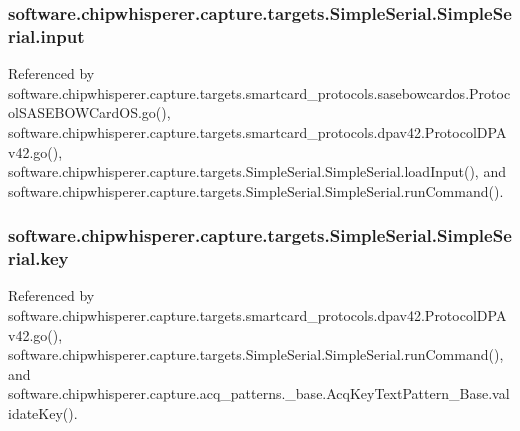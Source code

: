 \subsubsection[{input}]{\setlength{\rightskip}{0pt plus 5cm}software.\+chipwhisperer.\+capture.\+targets.\+Simple\+Serial.\+Simple\+Serial.\+input}\label{classsoftware_1_1chipwhisperer_1_1capture_1_1targets_1_1SimpleSerial_1_1SimpleSerial_a2e3fe744dcd57c9207306c1a5820f143}


Referenced by software.\+chipwhisperer.\+capture.\+targets.\+smartcard\+\_\+protocols.\+sasebowcardos.\+Protocol\+S\+A\+S\+E\+B\+O\+W\+Card\+O\+S.\+go(), software.\+chipwhisperer.\+capture.\+targets.\+smartcard\+\_\+protocols.\+dpav42.\+Protocol\+D\+P\+Av42.\+go(), software.\+chipwhisperer.\+capture.\+targets.\+Simple\+Serial.\+Simple\+Serial.\+load\+Input(), and software.\+chipwhisperer.\+capture.\+targets.\+Simple\+Serial.\+Simple\+Serial.\+run\+Command().

\hypertarget{classsoftware_1_1chipwhisperer_1_1capture_1_1targets_1_1SimpleSerial_1_1SimpleSerial_aecee9b234b0dfe803a753fee1a85eb5e}{}
\subsubsection[{key}]{\setlength{\rightskip}{0pt plus 5cm}software.\+chipwhisperer.\+capture.\+targets.\+Simple\+Serial.\+Simple\+Serial.\+key}\label{classsoftware_1_1chipwhisperer_1_1capture_1_1targets_1_1SimpleSerial_1_1SimpleSerial_aecee9b234b0dfe803a753fee1a85eb5e}


Referenced by software.\+chipwhisperer.\+capture.\+targets.\+smartcard\+\_\+protocols.\+dpav42.\+Protocol\+D\+P\+Av42.\+go(), software.\+chipwhisperer.\+capture.\+targets.\+Simple\+Serial.\+Simple\+Serial.\+run\+Command(), and software.\+chipwhisperer.\+capture.\+acq\+\_\+patterns.\+\_\+base.\+Acq\+Key\+Text\+Pattern\+\_\+\+Base.\+validate\+Key().

\hypertarget{classsoftware_1_1chipwhisperer_1_1capture_1_1targets_1_1SimpleSerial_1_1SimpleSerial_a5a2974d7c715f6489143f8a93c32e152}{}

